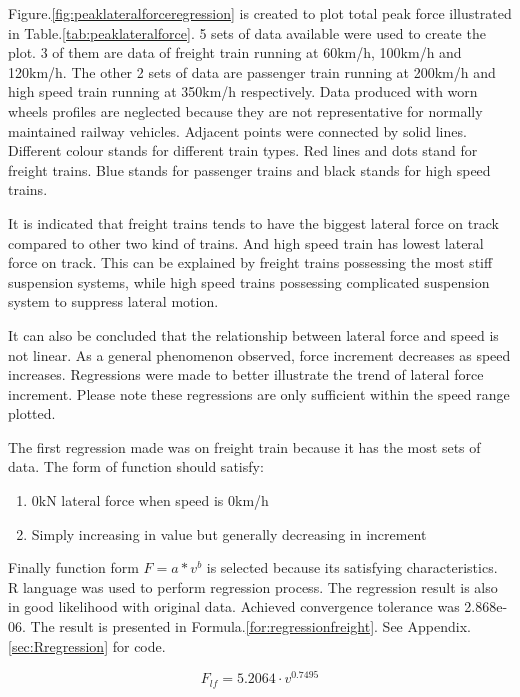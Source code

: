 Figure.\ref{fig:peaklateralforceregression} is created to plot total peak force illustrated in Table.\ref{tab:peaklateralforce}. 5 sets of data available were used to create the plot. 3 of them are data of freight train running at 60km/h, 100km/h and 120km/h. The other 2 sets of data are passenger train running at 200km/h and high speed train running at 350km/h respectively. Data produced with worn wheels profiles are neglected because they are not representative for normally maintained railway vehicles. Adjacent points were connected by solid lines. Different colour stands for different train types. Red lines and dots stand for freight trains. Blue stands for passenger trains and black stands for high speed trains. 

It is indicated that freight trains tends to have the biggest lateral force on track compared to other two kind of trains. And high speed train has lowest lateral force on track. This can be explained by freight trains possessing the most stiff suspension systems, while high speed trains possessing complicated suspension system to suppress lateral motion.

It can also be concluded that the relationship between lateral force and speed is not linear. As a general phenomenon observed, force increment decreases as speed increases. Regressions were made to better illustrate the trend of lateral force increment. Please note these regressions are only sufficient within the speed range plotted.

The first regression made was on freight train because it has the most sets of data. The form of function should satisfy:

\begin{enumerate}  
    \item 0kN lateral force when speed is 0km/h
    \item Simply increasing in value but generally decreasing in increment
\end{enumerate}

Finally function form $F=a*v^b$ is selected because its satisfying characteristics. R language was used to perform regression process. The regression result is also in good likelihood with original data. Achieved convergence tolerance was 2.868e-06. The result is presented in Formula.\ref{for:regressionfreight}. See Appendix.\ref{sec:Rregression} for code.

\begin{equation}
\label{for:regressionfreight}
F_{lf} = 5.2064\cdot v^{0.7495}
\end{equation}

